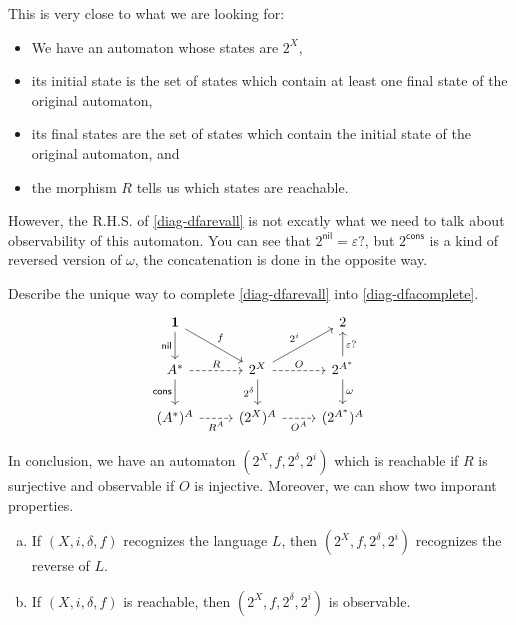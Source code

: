 \documentclass[main.tex]{subfiles}
\begin{document}
This is very close to what we are looking for:
\begin{itemize}
    \item We have an automaton whose states are $2^X$,
    \item its initial state is the set of states which contain at least one final state of the original automaton,
    \item its final states are the set of states which contain the initial state of the original automaton, and
    \item the morphism $R$ tells us which states are reachable.
\end{itemize}
However, the R.H.S. of \eqref{diag-dfarevall} is not excatly what we need to talk about observability of this automaton. You can see that $2^{\textsf{nil}} = \varepsilon?$, but $2^{\textsf{cons}}$ is a kind of reversed version of $\omega$, the concatenation is done in the opposite way.
\begin{exer}[1pts]
    Describe the unique way to complete \eqref{diag-dfarevall} into \eqref{diag-dfacomplete}.
    \begin{equation}\label{diag-dfacomplete}
    \begin{tikzcd}
    \mathbf{1} \arrow[rd, "f"] \arrow[d, "\textsf{nil}"'] & & 2 \\
    A^* \arrow[d, "\textsf{cons}"'] \arrow[r, "R", dashed] & 2^X \arrow[ru, "2^i"] \arrow[d, "2^{\delta}"'] \arrow[r, "O", dashed] & 2^{A^*} \arrow[u, "\varepsilon?"'] \arrow[d, "\omega"] \\
    (A^*)^A \arrow[r, "R^A"', dashed] & (2^X)^A \arrow[r, "O^A"', dashed] & (2^{A^*})^A 
    \end{tikzcd}
    \end{equation}
\end{exer}
In conclusion, we have an automaton $(2^X, f, 2^{\delta}, 2^i)$ which is reachable if $R$ is surjective and observable if $O$ is injective. Moreover, we can show two imporant properties.

\begin{exer}[4pts]
    \begin{enumerate}[(a)]
        \item If $(X, i, \delta, f)$ recognizes the language $L$, then $(2^X, f, 2^{\delta}, 2^i)$ recognizes the reverse of $L$.
        \item If $(X, i, \delta, f)$ is reachable, then $(2^X, f, 2^{\delta}, 2^i)$ is observable.
    \end{enumerate}
\end{exer}
\end{document}
